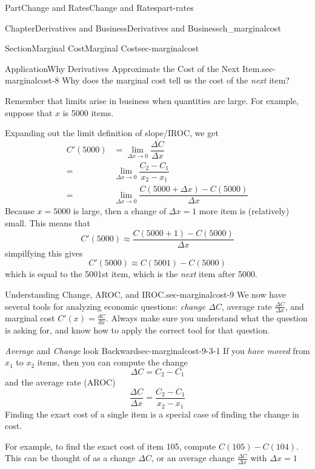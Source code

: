 \documentclass[oneside,10pt,]{tufte-book}
\numberwithin{equation}{chapter}
\newcommand{\amp}{&}
\begin{document}
\begin{partptx}{Part}{Change and Rates}{}{Change and Rates}{}{}{part-rates}
\begin{chapterptx}{Chapter}{Derivatives and Business}{}{Derivatives and Business}{}{}{ch_marginalcost}
\begin{sectionptx}{Section}{Marginal Cost}{}{Marginal Cost}{}{}{sec-marginalcost}
\begin{insight}{Application}{Why Derivatives Approximate the Cost of the Next Item.}{sec-marginalcost-8}
Why does the marginal cost tell us the cost of the \emph{next} item?%
\par
Remember that limits arise in business when quantities are large.  For example, suppose that \(x\) is 5000 items.%
\par
Expanding out the limit definition of slope\slash{}IROC, we get%
\begin{align*}
C'(5000) \amp = \lim_{\Delta x \rightarrow 0}\dfrac{\Delta C}{\Delta x} \\
= \amp \lim_{\Delta x \rightarrow 0} \dfrac{C_2 - C_1}{x_2 - x_1}\\
= \amp \lim_{\Delta x \rightarrow 0} \dfrac{C(5000 + \Delta x) - C(5000)}{\Delta x}
\end{align*}
Because \(x=5000\) is large, then a change of \(\Delta x=1\) more item is (relatively) small. This means that%
\begin{equation*}
C'(5000) \approx  \dfrac{C(5000 + 1) - C(5000)}{\Delta x}
\end{equation*}
simpilfying this gives%
\begin{equation*}
C'(5000) \approx  C(5001) - C(5000) 
\end{equation*}
which is equal to the 5001st item, which is the \emph{next} item after 5000.%
\end{insight}
\begin{paragraphs}{Understanding Change, AROC, and IROC.}{sec-marginalcost-9}%
We now have several tools for analyzing economic questions: \emph{change \(\Delta C\)}, average rate \(\frac{\Delta C}{\Delta x}\), and marginal cost \(C'(x) = \frac{dC}{dx}\). Always make sure you understand what the question is asking for, and know how to apply the correct tool for that question.%
%
\begin{descriptionlist}
\begin{dlimedium}{\emph{Average} and \emph{Change} look Backward}{sec-marginalcost-9-3-1}%
If you \emph{have moved} from \(x_1\) to \(x_2\) items, then you can compute the change%
\begin{equation*}
\Delta C = C_2 - C_1 
\end{equation*}
and the average rate (AROC)%
\begin{equation*}
\frac{\Delta C}{\Delta x} = \dfrac{C_2 - C_1}{x_2-x_1}
\end{equation*}
Finding the exact cost of a single item is a special case of finding the change in cost.%
\par
For example, to find the exact cost of item 105, compute \(C(105)-C(104)\).  This can be thought of as a change \(\Delta C\), or an average change \(\frac{\Delta C}{\Delta x}\) with \(\Delta x=1\)%

\end{dlimedium}
\end{descriptionlist}
\end{paragraphs}
\end{sectionptx}
\end{chapterptx}
\end{partptx}
\end{document}
